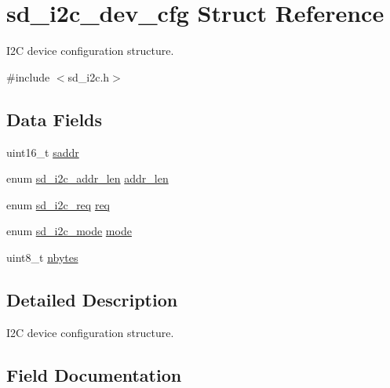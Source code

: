 \hypertarget{structsd__i2c__dev__cfg}{}\section{sd\+\_\+i2c\+\_\+dev\+\_\+cfg Struct Reference}
\label{structsd__i2c__dev__cfg}


I2C device configuration structure.  




{\ttfamily \#include $<$sd\+\_\+i2c.\+h$>$}

\subsection*{Data Fields}
\begin{DoxyCompactItemize}
\item 
uint16\+\_\+t \mbox{\hyperlink{structsd__i2c__dev__cfg_a500518ac1160f8bbf53c07dc91c30c1f}{saddr}}
\item 
enum \mbox{\hyperlink{group___s_d___i2_c___types_ga1abb9f3e149e857548cfa3288be0be80}{sd\+\_\+i2c\+\_\+addr\+\_\+len}} \mbox{\hyperlink{structsd__i2c__dev__cfg_af20c2bb228925f57a1b6804e070d333a}{addr\+\_\+len}}
\item 
enum \mbox{\hyperlink{group___s_d___i2_c___types_gaf19c3b18fa107e09353acbf263f8a730}{sd\+\_\+i2c\+\_\+req}} \mbox{\hyperlink{structsd__i2c__dev__cfg_a7147bab5e0c48a261ae145a970221d7b}{req}}
\item 
enum \mbox{\hyperlink{group___s_d___i2_c___types_ga082fa398268d3004bcdde8772078013c}{sd\+\_\+i2c\+\_\+mode}} \mbox{\hyperlink{structsd__i2c__dev__cfg_a0c2ed6c8922cc263a64954af15c30164}{mode}}
\item 
uint8\+\_\+t \mbox{\hyperlink{structsd__i2c__dev__cfg_a1dd08fc6e4d60cbf48ee9beeeda4b5bc}{nbytes}}
\end{DoxyCompactItemize}


\subsection{Detailed Description}
I2C device configuration structure. 

\subsection{Field Documentation}
\mbox{\label{structsd__i2c__dev__cfg_af20c2bb228925f57a1b6804e070d333a}} 
